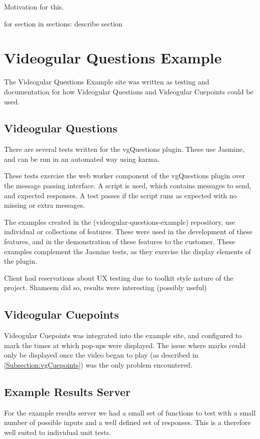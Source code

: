 Motivation for this.

{for section in sections: describe section}

\section{Videogular Questions Example} 
\label{Section:Videogular Questions Example}

The Videogular Questions Example site was written as testing and documentation for how Videogular Questions and Videogular Cuepoints could be used. 

\subsection{Videogular Questions}
\label{Subsection:Videogular Questions in example}

There are several tests written for the vgQuestions plugin. These use Jasmine, and can be run in an automated way using karma.

These tests exercise the web worker component of the vgQuestions plugin over the message passing interface. A script is used, which contains messages to send, and expected responses. A test passes if the script runs as expected with no missing or extra messages.

The examples created in the (videogular-questions-example) repository, use individual or collections of features. These were used in the development of these features, and in the demonstration of these features to the customer.  These examples complement the Jasmine tests, as they exercise the display elements of the plugin.

Client had reservations about UX testing due to toolkit style nature of the project. Shameem did so, results were interesting (possibly useful) 

\subsection{Videogular Cuepoints}
\label{Subsection:Videogular Cuepoints in example}
\gls{Videogular} Cuepoints was integrated into the example site, and configured to mark the times at which pop-ups were displayed. The issue where marks could only be displayed once the video began to play (as described in \autoref{Subsection:vgCuepoints}) was the only problem encountered.

\subsection{Example Results Server}
\label{Subsection:Example Results Server in example}
For the example results server we had a small set of functions to test with a small number of possible inputs and a well defined set of responses. This is a therefore well suited to individual unit tests.

